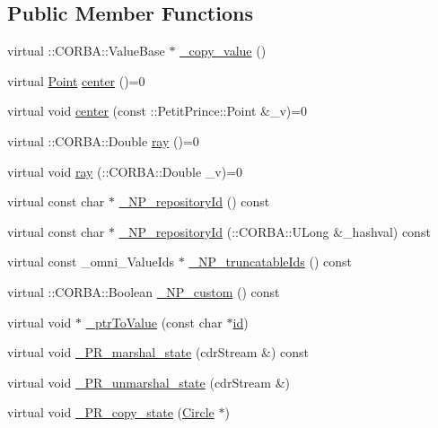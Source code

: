 \subsection*{Public Member Functions}
\begin{DoxyCompactItemize}
\item 
virtual \+::C\+O\+R\+B\+A\+::\+Value\+Base $\ast$ \hyperlink{class_circle_a77491043677d6e55c0647af478178bb3}{\+\_\+copy\+\_\+value} ()
\item 
virtual \hyperlink{struct_point}{Point} \hyperlink{class_circle_a7e6386f745d6255a2ddec2a53ff514b7}{center} ()=0
\item 
virtual void \hyperlink{class_circle_a9c4d4e9ec2a2e59f0c8d0c3f36e10edc}{center} (const \+::Petit\+Prince\+::\+Point \&\+\_\+v)=0
\item 
virtual \+::C\+O\+R\+B\+A\+::\+Double \hyperlink{class_circle_a1ddff289fde40dc6c25963c0c7b8d985}{ray} ()=0
\item 
virtual void \hyperlink{class_circle_a850aad5e97721700746efd3d82af1487}{ray} (\+::C\+O\+R\+B\+A\+::\+Double \+\_\+v)=0
\item 
virtual const char $\ast$ \hyperlink{class_circle_aef9e3dad8cb215413d3d9371c21312ba}{\+\_\+\+N\+P\+\_\+repository\+Id} () const 
\item 
virtual const char $\ast$ \hyperlink{class_circle_a2b46a87a83e6e4953bf3cbd507a99e26}{\+\_\+\+N\+P\+\_\+repository\+Id} (\+::C\+O\+R\+B\+A\+::\+U\+Long \&\+\_\+hashval) const 
\item 
virtual const \+\_\+omni\+\_\+\+Value\+Ids $\ast$ \hyperlink{class_circle_aaf148f2aa3a4bc47c990850800897ff9}{\+\_\+\+N\+P\+\_\+truncatable\+Ids} () const 
\item 
virtual \+::C\+O\+R\+B\+A\+::\+Boolean \hyperlink{class_circle_a5c0763ec17a208a2e25796b7714975cf}{\+\_\+\+N\+P\+\_\+custom} () const 
\item 
virtual void $\ast$ \hyperlink{class_circle_a4bcb25e2b518b4674bf81439c8f4ef6a}{\+\_\+ptr\+To\+Value} (const char $\ast$\hyperlink{class_draw_a50509da989141b00a5ae22d68a4d5856}{id})
\item 
virtual void \hyperlink{class_circle_af2d05d9a1c7ac75312e9e778b55a5625}{\+\_\+\+P\+R\+\_\+marshal\+\_\+state} (cdr\+Stream \&) const 
\item 
virtual void \hyperlink{class_circle_a7756078d5d749f39cd6620de130cfd0e}{\+\_\+\+P\+R\+\_\+unmarshal\+\_\+state} (cdr\+Stream \&)
\item 
virtual void \hyperlink{class_circle_a5a2cf4d7bb6f06052c34ecf0467cbe69}{\+\_\+\+P\+R\+\_\+copy\+\_\+state} (\hyperlink{class_circle}{Circle} $\ast$)
\end{DoxyCompactItemize}
